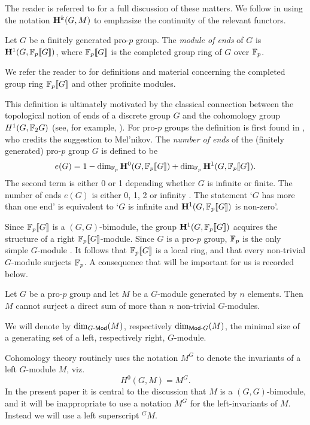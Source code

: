\documentclass[draft, a4paper]{article}
\begin{document}
The reader is referred to \cite{SW00} for a full discussion of these matters. We follow \cite{SW00} in using the notation ${\bf H}^k(G,M)$ to emphasize the continuity of the relevant functors.

\begin{defn}
Let $G$ be a finitely generated pro-$p$ group. The {\em module of ends} of $G$ is ${\bf H}^1(G,{\mathbb{F}_p[\![G]\!]})$, where ${\mathbb{F}_p[\![G]\!]}$ is the completed group ring of $G$ over $\mathbb{F}_p$. 
\end{defn}
We refer the reader to \cite[Chapter 5]{RZ00} for definitions and material concerning the completed group ring ${\mathbb{F}_p[\![G]\!]}$ and other profinite modules. 

This definition is ultimately motivated by the classical connection between the topological notion of ends of a discrete group $G$ and the cohomology group $H^1(G,\mathbb{F}_2 G)$ (see, for example, \cite{Stallings68}). For pro-$p$ groups the definition is first found in \cite{Korenev04}, who credits the suggestion to Mel'nikov. The {\em number of ends} of the (finitely generated) pro-$p$ group $G$ is defined to be
\[e(G) = 1-\dim_{\mathbb{F}_p} {\bf H}^0(G,{\mathbb{F}_p[\![G]\!]}) + \dim_{\mathbb{F}_p} {\bf H}^1(G,{\mathbb{F}_p[\![G]\!]}).\]
The second term is either 0 or 1 depending whether $G$ is infinite or finite. The number of ends $e(G)$ is either 0, 1, 2 or infinity \cite[Theorem 1]{Korenev04}. The statement `$G$ has more than one end' is equivalent to `$G$ is infinite and ${\bf H}^1(G,{\mathbb{F}_p[\![G]\!]})$ is non-zero'.

Since ${\mathbb{F}_p[\![G]\!]}$ is a $(G,G)$-bimodule, the group ${\bf H}^1(G,{\mathbb{F}_p[\![G]\!]})$ acquires the structure of a right ${\mathbb{F}_p[\![G]\!]}$-module. Since $G$ is a pro-$p$ group, $\mathbb{F}_p$ is the only simple $G$-module \cite[Lemma 7.1.5]{RZ00}. It follows that ${\mathbb{F}_p[\![G]\!]}$ is a local ring, and that every non-trivial $G$-module surjects $\mathbb{F}_p$. A consequence that will be important for us is recorded below.
\begin{lem}\label{lem:directsumslocalring}
Let $G$ be a pro-$p$ group and let $M$ be a $G$-module generated by $n$ elements. Then $M$ cannot surject a direct sum of more than $n$ non-trivial $G$-modules.
\end{lem}
We will denote by $\dim_{G\text{-}{\sf Mod}}(M)$, respectively $\dim_{{\sf Mod}\text{-}G}(M)$, the minimal size of a generating set of a left, respectively right, $G$-module.
\begin{cnv}
Cohomology theory routinely uses the notation $M^G$ to denote the invariants of a left $G$-module $M$, viz.
\[H^0(G,M) = M^G.\]
In the present paper it is central to the discussion that $M$ is a $(G,G)$-bimodule, and it will be inappropriate to use a notation $M^G$ for the left-invariants of $M$. Instead we will use a left superscript ${}^G\!M$.
\end{cnv}
\end{document}
